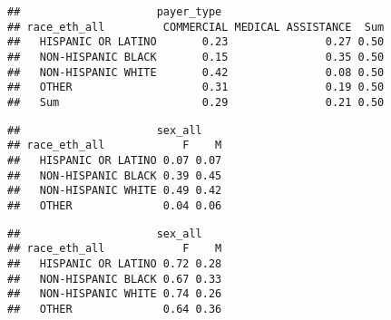 \documentclass[]{article}
\newenvironment{Shaded}{\begin{snugshade}}{\end{snugshade}}
\newcommand{\KeywordTok}[1]{\textcolor[rgb]{0.13,0.29,0.53}{\textbf{#1}}}
\newcommand{\DataTypeTok}[1]{\textcolor[rgb]{0.13,0.29,0.53}{#1}}
\newcommand{\DecValTok}[1]{\textcolor[rgb]{0.00,0.00,0.81}{#1}}
\newcommand{\StringTok}[1]{\textcolor[rgb]{0.31,0.60,0.02}{#1}}
\newcommand{\CommentTok}[1]{\textcolor[rgb]{0.56,0.35,0.01}{\textit{#1}}}
\newcommand{\OperatorTok}[1]{\textcolor[rgb]{0.81,0.36,0.00}{\textbf{#1}}}
\newcommand{\NormalTok}[1]{#1}
\begin{document}
\begin{Shaded}
\end{Shaded}

\begin{verbatim}
##                     payer_type
## race_eth_all         COMMERCIAL MEDICAL ASSISTANCE  Sum
##   HISPANIC OR LATINO       0.23               0.27 0.50
##   NON-HISPANIC BLACK       0.15               0.35 0.50
##   NON-HISPANIC WHITE       0.42               0.08 0.50
##   OTHER                    0.31               0.19 0.50
##   Sum                      0.29               0.21 0.50
\end{verbatim}

\begin{Shaded}
\end{Shaded}

\begin{verbatim}
##                     sex_all
## race_eth_all            F    M
##   HISPANIC OR LATINO 0.07 0.07
##   NON-HISPANIC BLACK 0.39 0.45
##   NON-HISPANIC WHITE 0.49 0.42
##   OTHER              0.04 0.06
\end{verbatim}

\begin{Shaded}
\end{Shaded}

\begin{verbatim}
##                     sex_all
## race_eth_all            F    M
##   HISPANIC OR LATINO 0.72 0.28
##   NON-HISPANIC BLACK 0.67 0.33
##   NON-HISPANIC WHITE 0.74 0.26
##   OTHER              0.64 0.36
\end{verbatim}
\end{document}

